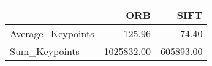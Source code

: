\begin{tabular}{lrr}
\toprule
 & ORB & SIFT \\
\midrule
Average_Keypoints & 125.96 & 74.40 \\
Sum_Keypoints & 1025832.00 & 605893.00 \\
\bottomrule
\end{tabular}
